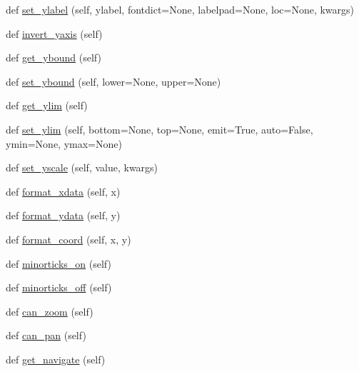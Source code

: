 \begin{DoxyCompactItemize}
\item 
def \hyperlink{classmatplotlib_1_1axes_1_1__base_1_1__AxesBase_ae1538e499bd741bd1dde24477c43b610}{set\+\_\+ylabel} (self, ylabel, fontdict=None, labelpad=None, loc=None, kwargs)
\item 
def \hyperlink{classmatplotlib_1_1axes_1_1__base_1_1__AxesBase_a79aa044b8315ccf45e421b88f4e1a1c3}{invert\+\_\+yaxis} (self)
\item 
def \hyperlink{classmatplotlib_1_1axes_1_1__base_1_1__AxesBase_a9663f533fd7459f9d83dc829a5270cad}{get\+\_\+ybound} (self)
\item 
def \hyperlink{classmatplotlib_1_1axes_1_1__base_1_1__AxesBase_a3dc4aafb934e8c9e38c37a8e2151339f}{set\+\_\+ybound} (self, lower=None, upper=None)
\item 
def \hyperlink{classmatplotlib_1_1axes_1_1__base_1_1__AxesBase_af0f3702712b18872a9d7db0642bf034f}{get\+\_\+ylim} (self)
\item 
def \hyperlink{classmatplotlib_1_1axes_1_1__base_1_1__AxesBase_a82df7b21b0e9f47cf6cd454e84ea5414}{set\+\_\+ylim} (self, bottom=None, top=None, emit=True, auto=False, ymin=None, ymax=None)
\item 
def \hyperlink{classmatplotlib_1_1axes_1_1__base_1_1__AxesBase_a708856db59b121acde2d36e1d25cad03}{set\+\_\+yscale} (self, value, kwargs)
\item 
def \hyperlink{classmatplotlib_1_1axes_1_1__base_1_1__AxesBase_a37a99f575bf8ab97da6e1b059f12bf51}{format\+\_\+xdata} (self, x)
\item 
def \hyperlink{classmatplotlib_1_1axes_1_1__base_1_1__AxesBase_a96bec767d345751b7a482454a3861789}{format\+\_\+ydata} (self, y)
\item 
def \hyperlink{classmatplotlib_1_1axes_1_1__base_1_1__AxesBase_a6f25add0375c3fd8f4d80280ee06b030}{format\+\_\+coord} (self, x, y)
\item 
def \hyperlink{classmatplotlib_1_1axes_1_1__base_1_1__AxesBase_ac43dca5e0dcb371979797b86ac402868}{minorticks\+\_\+on} (self)
\item 
def \hyperlink{classmatplotlib_1_1axes_1_1__base_1_1__AxesBase_a959b2fe4057fa23808b811bf5728f847}{minorticks\+\_\+off} (self)
\item 
def \hyperlink{classmatplotlib_1_1axes_1_1__base_1_1__AxesBase_a7eba2ce6e0cf7d55b9830c55321e7b7d}{can\+\_\+zoom} (self)
\item 
def \hyperlink{classmatplotlib_1_1axes_1_1__base_1_1__AxesBase_a8b9462e304f53956b675048256c9b860}{can\+\_\+pan} (self)
\item 
def \hyperlink{classmatplotlib_1_1axes_1_1__base_1_1__AxesBase_aa33f4112c79c2fbfbd13322b62942aff}{get\+\_\+navigate} (self)

\end{DoxyCompactItemize}

